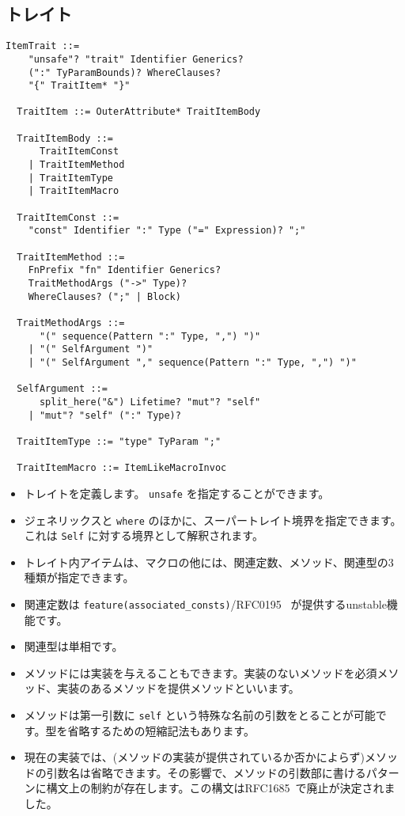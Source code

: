 \documentclass[dvipdfmx,uplatex,papersize,a4paper,10pt]{jsbook}
\theoremstyle{definition}
\begin{document}
\subsection{トレイト}

\begin{lstlisting}[language=BNFLike, gobble=2]
  ItemTrait ::=
    "unsafe"? "trait" Identifier Generics?
    (":" TyParamBounds)? WhereClauses?
    "{" TraitItem* "}"

  TraitItem ::= OuterAttribute* TraitItemBody

  TraitItemBody ::=
      TraitItemConst
    | TraitItemMethod
    | TraitItemType
    | TraitItemMacro

  TraitItemConst ::=
    "const" Identifier ":" Type ("=" Expression)? ";"

  TraitItemMethod ::=
    FnPrefix "fn" Identifier Generics?
    TraitMethodArgs ("->" Type)?
    WhereClauses? (";" | Block)

  TraitMethodArgs ::=
      "(" sequence(Pattern ":" Type, ",") ")"
    | "(" SelfArgument ")"
    | "(" SelfArgument "," sequence(Pattern ":" Type, ",") ")"

  SelfArgument ::=
      split_here("&") Lifetime? "mut"? "self"
    | "mut"? "self" (":" Type)?

  TraitItemType ::= "type" TyParam ";"

  TraitItemMacro ::= ItemLikeMacroInvoc
\end{lstlisting}

\begin{itemize}
  \item トレイトを定義します。 \verb|unsafe| を指定することができます。
  \item ジェネリックスと \verb|where| のほかに、スーパートレイト境界を指定できます。これは \verb|Self| に対する境界として解釈されます。
  \item トレイト内アイテムは、マクロの他には、関連定数、メソッド、関連型の3種類が指定できます。
  \item 関連定数は \verb|feature(associated_consts)|/RFC0195~\cite{RustRFC0195} が提供するunstable機能です。
  \item 関連型は単相です。
  \item メソッドには実装を与えることもできます。実装のないメソッドを必須メソッド、実装のあるメソッドを提供メソッドといいます。
  \item メソッドは第一引数に \verb|self| という特殊な名前の引数をとることが可能です。型を省略するための短縮記法もあります。
  \item 現在の実装では、(メソッドの実装が提供されているか否かによらず)メソッドの引数名は省略できます。その影響で、メソッドの引数部に書けるパターンに構文上の制約が存在します。この構文はRFC1685~\cite{RustRFC1685}で廃止が決定されました。
\end{itemize}
\end{document}
